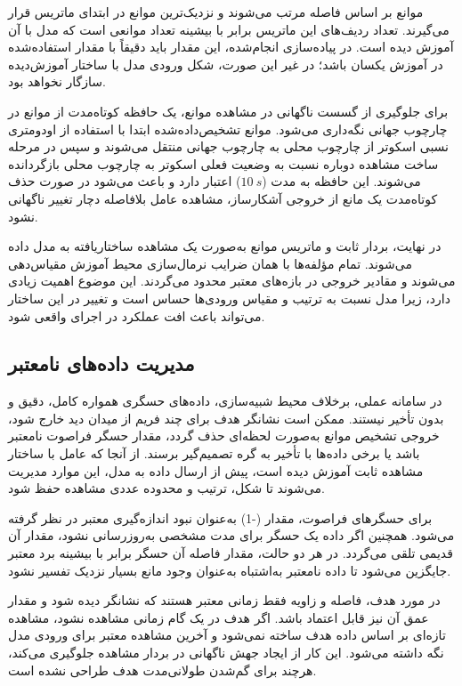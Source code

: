 موانع بر اساس فاصله مرتب می‌شوند و نزدیک‌ترین موانع در ابتدای ماتریس قرار می‌گیرند. تعداد ردیف‌های این ماتریس برابر با بیشینه تعداد موانعی است که مدل با آن آموزش دیده است. در پیاده‌سازی انجام‌شده، این مقدار باید دقیقاً با مقدار استفاده‌شده در آموزش یکسان باشد؛ در غیر این صورت، شکل ورودی مدل با ساختار آموزش‌دیده سازگار نخواهد بود.

برای جلوگیری از گسست ناگهانی در مشاهده موانع، یک حافظه کوتاه‌مدت از موانع در چارچوب جهانی نگه‌داری می‌شود. موانع تشخیص‌داده‌شده ابتدا با استفاده از اودومتری نسبی اسکوتر از چارچوب محلی به چارچوب جهانی منتقل می‌شوند و سپس در مرحله ساخت مشاهده دوباره نسبت به وضعیت فعلی اسکوتر به چارچوب محلی بازگردانده می‌شوند. این حافظه به مدت ($10~s$) اعتبار دارد و باعث می‌شود در صورت حذف کوتاه‌مدت یک مانع از خروجی آشکارساز، مشاهده عامل بلافاصله دچار تغییر ناگهانی نشود.

در نهایت، بردار ثابت و ماتریس موانع به‌صورت یک مشاهده ساختاریافته به مدل داده می‌شوند. تمام مؤلفه‌ها با همان ضرایب نرمال‌سازی محیط آموزش مقیاس‌دهی می‌شوند و مقادیر خروجی در بازه‌های معتبر محدود می‌گردند. این موضوع اهمیت زیادی دارد، زیرا مدل  نسبت به ترتیب و مقیاس ورودی‌ها حساس است و تغییر در این ساختار می‌تواند باعث افت عملکرد در اجرای واقعی شود.

\subsection{مدیریت داده‌های نامعتبر}
\label{subsec:real_invalid_data_handling}

در سامانه عملی، برخلاف محیط شبیه‌سازی، داده‌های حسگری همواره کامل، دقیق و بدون تأخیر نیستند. ممکن است نشانگر هدف برای چند فریم از میدان دید خارج شود، خروجی تشخیص موانع به‌صورت لحظه‌ای حذف گردد، مقدار حسگر فراصوت نامعتبر باشد یا برخی داده‌ها با تأخیر به گره تصمیم‌گیر برسند. از آنجا که عامل  با ساختار مشاهده ثابت آموزش دیده است، پیش از ارسال داده به مدل، این موارد مدیریت می‌شوند تا شکل، ترتیب و محدوده عددی مشاهده حفظ شود.

برای حسگرهای فراصوت، مقدار (-1) به‌عنوان نبود اندازه‌گیری معتبر در نظر گرفته می‌شود. همچنین اگر داده یک حسگر برای مدت مشخصی به‌روزرسانی نشود، مقدار آن قدیمی تلقی می‌گردد. در هر دو حالت، مقدار فاصله آن حسگر برابر با بیشینه برد معتبر جایگزین می‌شود تا داده نامعتبر به‌اشتباه به‌عنوان وجود مانع بسیار نزدیک تفسیر نشود.

در مورد هدف، فاصله و زاویه فقط زمانی معتبر هستند که نشانگر  دیده شود و مقدار عمق آن نیز قابل اعتماد باشد. اگر هدف در یک گام زمانی مشاهده نشود، مشاهده تازه‌ای بر اساس داده هدف ساخته نمی‌شود و آخرین مشاهده معتبر برای ورودی مدل نگه داشته می‌شود. این کار از ایجاد جهش ناگهانی در بردار مشاهده جلوگیری می‌کند، هرچند برای گم‌شدن طولانی‌مدت هدف طراحی نشده است.

